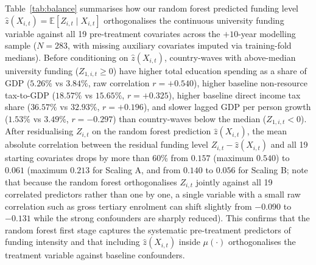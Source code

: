 \documentclass[11pt,a4paper]{article}
\begin{document}
Table~\ref{tab:balance} summarises how our random forest predicted funding level $\hat{z}(X_{i,t}) = \mathbb{E}[Z_{i,t} \mid X_{i,t}]$ orthogonalises the continuous university funding variable against all 19 pre-treatment covariates across the $+10$-year modelling sample ($N = 283$, with missing auxiliary covariates imputed via training-fold medians). Before conditioning on $\hat{z}(X_{i,t})$, country-waves with above-median university funding ($Z_{1,i,t} \ge 0$) have higher total education spending as a share of GDP ($5.26\%$ vs $3.84\%$, raw correlation $r = +0.540$), higher baseline non-resource tax-to-GDP ($18.57\%$ vs $15.65\%$, $r = +0.325$), higher baseline direct income tax share ($36.57\%$ vs $32.93\%$, $r = +0.196$), and slower lagged GDP per person growth ($1.53\%$ vs $3.49\%$, $r = -0.297$) than country-waves below the median ($Z_{1,i,t} < 0$). After residualising $Z_{i,t}$ on the random forest prediction $\hat{z}(X_{i,t})$, the mean absolute correlation between the residual funding level $Z_{i,t} - \hat{z}(X_{i,t})$ and all 19 starting covariates drops by more than 60\% from $0.157$ (maximum $0.540$) to $0.061$ (maximum $0.213$ for Scaling A, and from $0.140$ to $0.056$ for Scaling B; note that because the random forest orthogonalises $Z_{i,t}$ jointly against all 19 correlated predictors rather than one by one, a single variable with a small raw correlation such as gross tertiary enrolment can shift slightly from $-0.090$ to $-0.131$ while the strong confounders are sharply reduced). This confirms that the random forest first stage captures the systematic pre-treatment predictors of funding intensity and that including $\hat{z}(X_{i,t})$ inside $\mu(\cdot)$ orthogonalises the treatment variable against baseline confounders.
\end{document}
